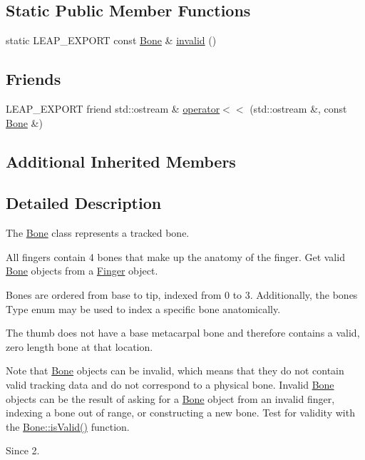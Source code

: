 \subsection*{Static Public Member Functions}
\begin{DoxyCompactItemize}
\item 
static L\+E\+A\+P\+\_\+\+E\+X\+P\+O\+RT const \hyperlink{class_leap_1_1_bone}{Bone} \& \hyperlink{class_leap_1_1_bone_a5751c0c4533daf8332aa48b986e75cc2}{invalid} ()
\end{DoxyCompactItemize}
\subsection*{Friends}
\begin{DoxyCompactItemize}
\item 
L\+E\+A\+P\+\_\+\+E\+X\+P\+O\+RT friend std\+::ostream \& \hyperlink{class_leap_1_1_bone_a432facbe3496dc0ec64ce42c840eacd6}{operator$<$$<$} (std\+::ostream \&, const \hyperlink{class_leap_1_1_bone}{Bone} \&)
\end{DoxyCompactItemize}
\subsection*{Additional Inherited Members}


\subsection{Detailed Description}
The \hyperlink{class_leap_1_1_bone}{Bone} class represents a tracked bone.

All fingers contain 4 bones that make up the anatomy of the finger. Get valid \hyperlink{class_leap_1_1_bone}{Bone} objects from a \hyperlink{class_leap_1_1_finger}{Finger} object.

Bones are ordered from base to tip, indexed from 0 to 3. Additionally, the bone\textquotesingle{}s Type enum may be used to index a specific bone anatomically.


\begin{DoxyCodeInclude}
\end{DoxyCodeInclude}


The thumb does not have a base metacarpal bone and therefore contains a valid, zero length bone at that location.

Note that \hyperlink{class_leap_1_1_bone}{Bone} objects can be invalid, which means that they do not contain valid tracking data and do not correspond to a physical bone. Invalid \hyperlink{class_leap_1_1_bone}{Bone} objects can be the result of asking for a \hyperlink{class_leap_1_1_bone}{Bone} object from an invalid finger, indexing a bone out of range, or constructing a new bone. Test for validity with the \hyperlink{class_leap_1_1_bone_a82b71f671aedac1eb3cf5ff4e762e963}{Bone\+::is\+Valid()} function. \begin{DoxySince}{Since}
2. 
\end{DoxySince}


